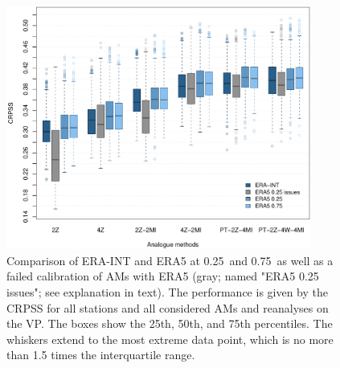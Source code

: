 \documentclass[alpha-refs]{wiley-article}
\begin{document}
\begin{figure}[bt]
	\centering
	\includegraphics[width=100mm]{figure-4.pdf}
	\caption{Comparison of ERA-INT and ERA5 at 0.25\degree\ and 0.75\degree\ as well as a failed calibration of AMs with ERA5 (gray; named "ERA5 0.25 issues"; see explanation in text). The performance is given by the CRPSS for all stations and all considered AMs and reanalyses on the VP. The boxes show the 25th, 50th, and 75th percentiles. The whiskers extend to the most extreme data point, which is no more than 1.5 times the interquartile range.}
	\label{fig:resolution}
\end{figure}
\end{document}
